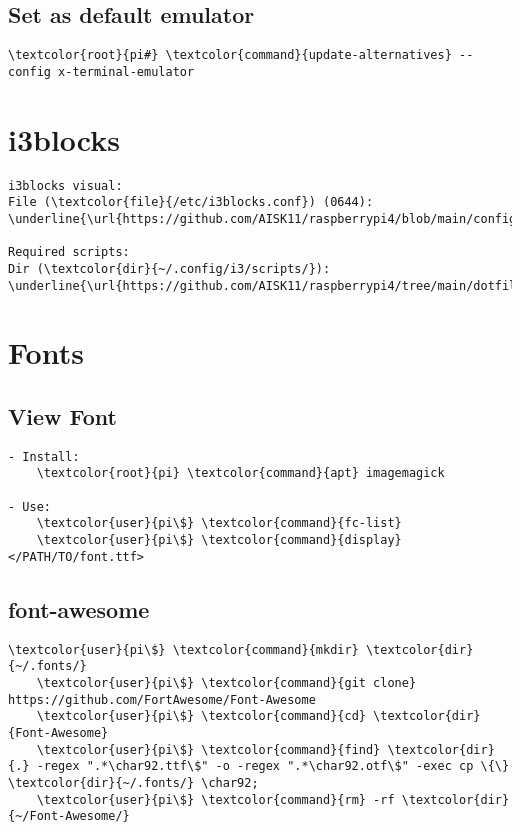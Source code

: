 \documentclass[10pt, a4paper, onecolumn, openany]{book} %
\begin{document}
\subsection{Set as default emulator}
\begin{Verbatim}[commandchars=\\\{\}]    
    \textcolor{root}{pi#} \textcolor{command}{update-alternatives} --config x-terminal-emulator
\end{Verbatim}

\section{i3blocks}
\begin{Verbatim}[commandchars=\\\{\}]
i3blocks visual:
File (\textcolor{file}{/etc/i3blocks.conf}) (0644):
\underline{\url{https://github.com/AISK11/raspberrypi4/blob/main/config_files/i3blocks.conf}}

Required scripts:
Dir (\textcolor{dir}{~/.config/i3/scripts/}):
\underline{\url{https://github.com/AISK11/raspberrypi4/tree/main/dotfiles/.config/i3/scripts}}
\end{Verbatim}

\section{Fonts}
\subsection{View Font}
\begin{Verbatim}[commandchars=\\\{\}]
- Install:
    \textcolor{root}{pi} \textcolor{command}{apt} imagemagick
    
- Use:
    \textcolor{user}{pi\$} \textcolor{command}{fc-list} 
    \textcolor{user}{pi\$} \textcolor{command}{display} </PATH/TO/font.ttf>
\end{Verbatim}
\subsection{font-awesome}
\begin{Verbatim}[commandchars=\\\{\}]
    \textcolor{user}{pi\$} \textcolor{command}{mkdir} \textcolor{dir}{~/.fonts/}
    \textcolor{user}{pi\$} \textcolor{command}{git clone} https://github.com/FortAwesome/Font-Awesome
    \textcolor{user}{pi\$} \textcolor{command}{cd} \textcolor{dir}{Font-Awesome}
    \textcolor{user}{pi\$} \textcolor{command}{find} \textcolor{dir}{.} -regex ".*\char92.ttf\$" -o -regex ".*\char92.otf\$" -exec cp \{\} \textcolor{dir}{~/.fonts/} \char92;
    \textcolor{user}{pi\$} \textcolor{command}{rm} -rf \textcolor{dir}{~/Font-Awesome/}
\end{Verbatim}
\end{document}
